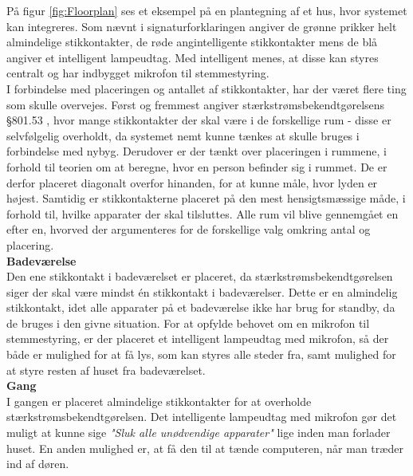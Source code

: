 

På figur \ref{fig:Floorplan} ses et eksempel på en plantegning af et hus, hvor systemet kan integreres. Som nævnt i signaturforklaringen angiver de grønne prikker helt almindelige stikkontakter, de røde angintelligente stikkontakter mens de blå angiver et intelligent lampeudtag. Med intelligent menes, at disse kan styres centralt og har indbygget mikrofon til stemmestyring. %
\\

I forbindelse med placeringen og antallet af stikkontakter, har der været flere ting som skulle overvejes. Først og fremmest angiver stærkstrømsbekendtgørelsens §801.53 \cite{staerkstroemsbekaendtgoerelse}, hvor mange stikkontakter der skal være i de forskellige rum - disse er selvfølgelig overholdt, da systemet nemt kunne tænkes at skulle bruges i forbindelse med nybyg. Derudover er der tænkt over placeringen i rummene, i forhold til teorien om at beregne, hvor en person befinder sig i rummet. De er derfor placeret diagonalt overfor hinanden, for at kunne måle, hvor lyden er højest. Samtidig er stikkontakterne placeret på den mest hensigtsmæssige måde, i forhold til, hvilke apparater der skal tilsluttes. Alle rum vil blive gennemgået en efter en, hvorved der argumenteres for de forskellige valg omkring antal og placering. \\

{\bf Badeværelse}\\
Den ene stikkontakt i badeværelset er placeret, da stærkstrømsbekendtgørelsen siger der skal være mindst én stikkontakt i badeværelser. Dette er en almindelig stikkontakt, idet alle apparater på et badeværelse ikke har brug for standby, da de bruges i den givne situation. For at opfylde behovet om en mikrofon til stemmestyring, er der placeret et intelligent lampeudtag med mikrofon, så der både er mulighed for at få lys, som kan styres alle steder fra, samt mulighed for at styre resten af huset fra badeværelset. \\

{\bf Gang}\\
I gangen er placeret almindelige stikkontakter for at overholde stærkstrømsbekendtgørelsen. Det intelligente lampeudtag med mikrofon gør det muligt at kunne sige \textit{"Sluk alle unødvendige apparater"} lige inden man forlader huset. En anden mulighed er, at få den til at tænde computeren, når man træder ind af døren.\\

